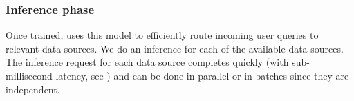 \subsubsection{Inference phase}
Once trained, \sys uses this model to efficiently route incoming user queries to relevant data sources.
We do an inference for each of the available data sources.
The inference request for each data source completes quickly (with sub-millisecond latency, see ) and can be done in parallel or in batches since they are independent.


